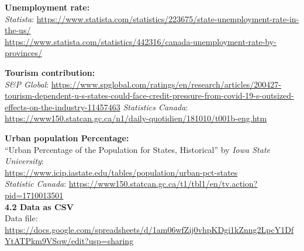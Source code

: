 \documentclass{article}
\begin{document}
\noindent \textbf{Unemployment rate:}\\
\textit{Statista}:
\url{https://www.statista.com/statistics/223675/state-unemployment-rate-in-the-us/}\\
\url{https://www.statista.com/statistics/442316/canada-unemployment-rate-by-provinces/}

\noindent \textbf{Tourism contribution:}\\
\textit{S&P Global}:
\url{https://www.spglobal.com/ratings/en/research/articles/200427-tourism-dependent-u-s-states-could-face-credit-pressure-from-covid-19-s-outsized-effects-on-the-industry-11457463}
\textit{Statistics Canada}:
\url{https://www150.statcan.gc.ca/n1/daily-quotidien/181010/t001b-eng.htm}

\noindent \textbf{Urban population Percentage:}\\
“Urban Percentage of the Population for States, Historical” by \textit{Iowa State University}:\\
\url{https://www.icip.iastate.edu/tables/population/urban-pct-states}\\
\textit{Statistic Canada}:
\url{https://www150.statcan.gc.ca/t1/tbl1/en/tv.action?pid=1710013501}\\

\newpage
\noindent\textbf{4.2 Data as CSV}\\
Data file: \url{https://docs.google.com/spreadsheets/d/1am06wfZij0vhpKDgi1kZnng2LpcY1DfYtATPkm9VSqw/edit?usp=sharing}
\end{document}

